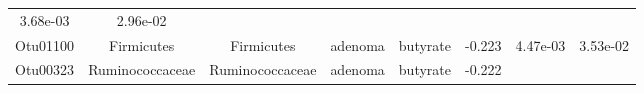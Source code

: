 \documentclass[11pt,]{article}
\begin{document}
\begin{longtable}[]{@{}cccccccc@{}}
\begin{minipage}[t]{0.08\columnwidth}
3.68e-03\strut
\end{minipage} & \begin{minipage}[t]{0.08\columnwidth}\centering\strut
2.96e-02\strut
\end{minipage}\tabularnewline
\begin{minipage}[t]{0.08\columnwidth}\centering\strut
Otu01100\strut
\end{minipage} & \begin{minipage}[t]{0.15\columnwidth}\centering\strut
Firmicutes\strut
\end{minipage} & \begin{minipage}[t]{0.15\columnwidth}\centering\strut
Firmicutes\strut
\end{minipage} & \begin{minipage}[t]{0.08\columnwidth}\centering\strut
adenoma\strut
\end{minipage} & \begin{minipage}[t]{0.09\columnwidth}\centering\strut
butyrate\strut
\end{minipage} & \begin{minipage}[t]{0.07\columnwidth}\centering\strut
-0.223\strut
\end{minipage} & \begin{minipage}[t]{0.08\columnwidth}\centering\strut
4.47e-03\strut
\end{minipage} & \begin{minipage}[t]{0.08\columnwidth}\centering\strut
3.53e-02\strut
\end{minipage}\tabularnewline
\begin{minipage}[t]{0.08\columnwidth}\centering\strut
Otu00323\strut
\end{minipage} & \begin{minipage}[t]{0.15\columnwidth}\centering\strut
Ruminococcaceae\strut
\end{minipage} & \begin{minipage}[t]{0.15\columnwidth}\centering\strut
Ruminococcaceae\strut
\end{minipage} & \begin{minipage}[t]{0.08\columnwidth}\centering\strut
adenoma\strut
\end{minipage} & \begin{minipage}[t]{0.09\columnwidth}\centering\strut
butyrate\strut
\end{minipage} & \begin{minipage}[t]{0.07\columnwidth}\centering\strut
-0.222\strut
\end{minipage} & \begin{minipage}[t]{0.08\columnwidth}\centering\strut

\end{minipage}
\end{longtable}
\end{document}

